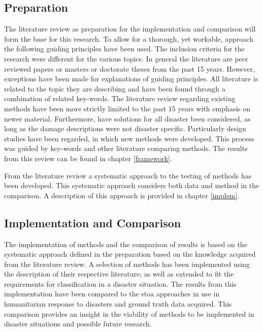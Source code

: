 \subsection{Preparation} \label{ssec:prep}
The literature review as preparation for the implementation and comparison will form the base for this research. To allow for a thorough, yet workable, approach the following guiding principles have been used. The inclusion criteria for the research were different for the various topics. In general the literature are peer reviewed papers or masters or doctorate theses from the past 15 years. However, exceptions have been made for explanations of guiding principles. All literature is related to the topic they are describing and have been found through a combination of related key-words. The literature review regarding existing methods have been more strictly limited to the past 15 years with emphasis on newer material. Furthermore, have solutions for all disaster been considered, as long as the damage descriptions were not disaster specific. Particularly design studies have been regarded, in which new methods were developed. This process was guided by key-words and other literature comparing methods. The results from this review can be found in chapter \ref{framework}.

\noindent From the literature review a systematic approach to the testing of methods has been developed. This systematic approach considers both data and method in the comparison. A description of this approach is provided in chapter \ref{implem}.
\subsection{Implementation and Comparison}
The implementation of methods and the comparison of results is based on the systematic approach defined in the preparation based on the knowledge acquired from the literature review. A selection of methods has been implemented using the description of their respective literature; as well as extended to fit the requirements for classification in a disaster situation. The results from this implementation have been compared to the \ac{stoa} approaches in use in humanitarian response to disasters and ground truth data acquired. This comparison provides an insight in the viability of methods to be implemented in disaster situations and possible future research.

